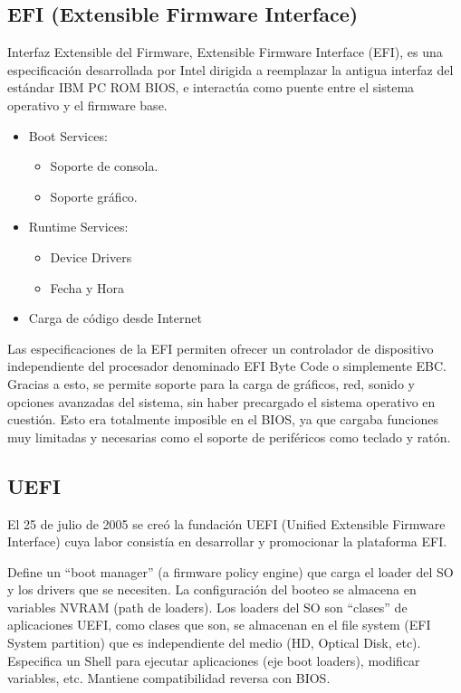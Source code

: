 \documentclass[a4paper, twoside]{article}
\begin{document}
\subsection{EFI (Extensible Firmware Interface)}
Interfaz Extensible del Firmware, Extensible Firmware Interface (EFI), es una
especificación desarrollada por Intel dirigida a reemplazar la antigua interfaz
del estándar IBM PC ROM BIOS, e interactúa como puente entre el sistema
operativo y el firmware base.

\begin{itemize}
  \item Boot Services:
  \begin{itemize}
    \item Soporte de consola.
    \item Soporte gráfico.
  \end{itemize}
  \item Runtime Services:
  \begin{itemize}
    \item Device Drivers
    \item Fecha y Hora
  \end{itemize}
  \item Carga de código desde Internet
\end{itemize}

Las especificaciones de la EFI permiten ofrecer un controlador de dispositivo
independiente del procesador denominado EFI Byte Code o simplemente EBC.
Gracias a esto, se permite soporte para la carga de gráficos, red, sonido y
opciones avanzadas del sistema, sin haber precargado el sistema operativo en
cuestión.
Esto era totalmente imposible en el BIOS, ya que cargaba funciones muy
limitadas y necesarias como el soporte de periféricos como teclado y ratón.

\subsection{UEFI}

El 25 de julio de 2005 se creó la fundación UEFI (Unified Extensible Firmware
Interface) cuya labor consistía en desarrollar y promocionar la plataforma EFI.

Define un ``boot manager'' (a firmware policy engine) que carga el loader
del SO y los drivers que se necesiten.
La configuración del booteo se almacena en variables NVRAM (path de loaders).
Los loaders del SO son ``clases'' de aplicaciones UEFI, como clases que son,
se almacenan en el file system (EFI System partition) que es independiente del
medio (HD, Optical Disk, etc).
Especifica un Shell para ejecutar aplicaciones (eje boot loaders),
modificar variables, etc.
Mantiene compatibilidad reversa con BIOS.
\end{document}
